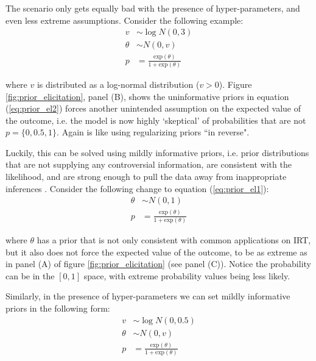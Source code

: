 The scenario only gets equally bad with the presence of hyper-parameters, and even less extreme assumptions. Consider the following example:
%
\begin{equation} \label{eq:prior_el2}
	\begin{split}
		v &\sim \log N(0, 3) \\	
		\theta &\sim N(0, v) \\
		p &= \frac{ \text{exp}(\theta) }{ 1 + \text{exp}(\theta) }
	\end{split}
\end{equation}

\noindent where $v$ is distributed as a log-normal distribution ($v>0$). Figure \ref{fig:prior_elicitation}, panel (B), shows the uninformative priors in equation (\ref{eq:prior_el2}) forces another unintended assumption on the expected value of the outcome, i.e. the model is now highly `skeptical' of probabilities that are not $p = \{0, 0.5, 1\}$. Again is like using regularizing priors ``in reverse".

Luckily, this can be solved using mildly informative priors, i.e. prior distributions that are not supplying any controversial information, are consistent with the likelihood, and are strong enough to pull the data away from inappropriate inferences \cite{Gelman_et_al_2014}. Consider the following change to equation (\ref{eq:prior_el1}):
%
\begin{equation} \label{eq:prior_el3}
	\begin{split}	
		\theta &\sim N(0, 1) \\
		p &= \frac{ \text{exp}(\theta) }{ 1 + \text{exp}(\theta) }
	\end{split}
\end{equation}

\noindent where $\theta$ has a prior that is not only consistent with common applications on IRT, but it also does not force the expected value of the outcome, to be as extreme as in panel (A) of figure \ref{fig:prior_elicitation} (see panel (C)). Notice the probability can be in the $[0,1]$ space, with extreme probability values being less likely.

Similarly, in the presence of hyper-parameters we can set mildly informative priors in the following form:
%
\begin{equation} \label{eq:prior_el4}
	\begin{split}
		v &\sim \log N(0, 0.5) \\	
		\theta &\sim N(0, v) \\
		p &= \frac{ \text{exp}(\theta) }{ 1 + \text{exp}(\theta) }
	\end{split}
\end{equation}

